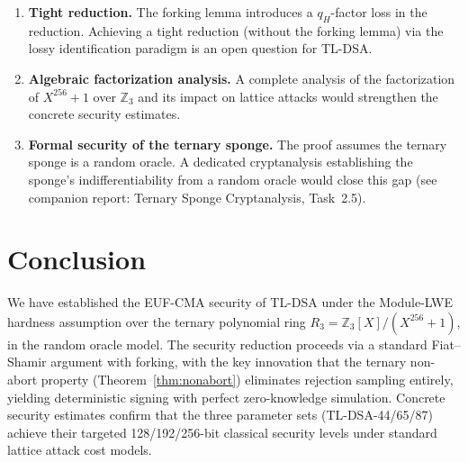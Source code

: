 \documentclass[11pt,a4paper]{article}
\theoremstyle{definition}
\newcommand{\Z}{\mathbb{Z}}
\begin{document}
\begin{enumerate}[leftmargin=2em]
\item \textbf{Tight reduction.} The forking lemma introduces a $q_H$-factor loss in the reduction. Achieving a tight reduction (without the forking lemma) via the lossy identification paradigm is an open question for TL-DSA.

\item \textbf{Algebraic factorization analysis.} A complete analysis of the factorization of $X^{256}+1$ over $\Z_3$ and its impact on lattice attacks would strengthen the concrete security estimates.

\item \textbf{Formal security of the ternary sponge.} The proof assumes the ternary sponge is a random oracle. A dedicated cryptanalysis establishing the sponge's indifferentiability from a random oracle would close this gap (see companion report: Ternary Sponge Cryptanalysis, Task~2.5).
\end{enumerate}

\section{Conclusion}

We have established the EUF-CMA security of TL-DSA under the Module-LWE hardness assumption over the ternary polynomial ring $R_3 = \Z_3[X]/(X^{256}+1)$, in the random oracle model. The security reduction proceeds via a standard Fiat--Shamir argument with forking, with the key innovation that the ternary non-abort property (Theorem~\ref{thm:nonabort}) eliminates rejection sampling entirely, yielding deterministic signing with perfect zero-knowledge simulation. Concrete security estimates confirm that the three parameter sets (TL-DSA-44/65/87) achieve their targeted 128/192/256-bit classical security levels under standard lattice attack cost models.
\end{document}
